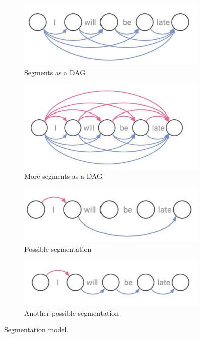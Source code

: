 \documentclass[a4paper, 12pt]{report}
\begin{document}
\begin{figure}
    \centering
    \begin{subfigure}[b]{0.45\textwidth}
        \centering
        \includegraphics[width=\textwidth]{figs/segmentation1.jpeg}
        \caption{Segments as a DAG}
        \label{fig:dag}
    \end{subfigure}
    \hfill
    \begin{subfigure}[b]{0.45\textwidth}
        \centering
        \includegraphics[width=\textwidth]{figs/segmentation2.jpeg}
        \caption{More segments as a DAG}
        \label{fig:dag2}
    \end{subfigure}
    \hfill
    \begin{subfigure}[b]{0.45\textwidth}
        \centering
        \includegraphics[width=\textwidth]{figs/segmentation3.jpeg}
        \caption{Possible segmentation}
        \label{fig:segmentation}
    \end{subfigure}
    \hfill
    \begin{subfigure}[b]{0.45\textwidth}
        \centering
        \includegraphics[width=\textwidth]{figs/segmentation4.jpeg}
        \caption{Another possible segmentation}
        \label{fig:segmentation2}
    \end{subfigure}
    \caption{Segmentation model.}
    \label{fig:segmentation_model}
\end{figure}
\end{document}

